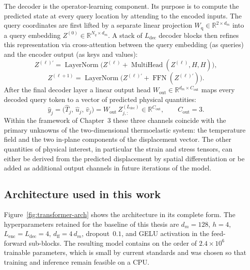 The decoder is the operator-learning component. Its purpose is to
compute the predicted state at every query location by attending to
the encoded inputs. The query coordinates are first lifted by a
separate linear projection
\(W_{\mathrm{q}}\in\mathbb{R}^{2\times d_m}\) into a query
embedding \(Z^{(0)}\in\mathbb{R}^{N_q\times d_m}\). A stack of
\(L_{\mathrm{dec}}\) decoder blocks then refines this representation
via cross-attention between the query embedding (as queries) and the
encoder output (as keys and values):
\begin{equation}
Z^{(\ell)'} =
\operatorname{LayerNorm}\!\big(
  Z^{(\ell)} +
  \operatorname{MultiHead}(Z^{(\ell)},H,H)
\big),
\end{equation}
\begin{equation}
Z^{(\ell+1)} =
\operatorname{LayerNorm}\!\big(
  Z^{(\ell)'} +
  \operatorname{FFN}(Z^{(\ell)'})
\big).
\end{equation}
After the final decoder layer a linear output head
\(W_{\mathrm{out}}\in\mathbb{R}^{d_m\times C_{\mathrm{out}}}\)
maps every decoded query token to a vector of predicted physical
quantities:
\begin{equation}
\hat{y}_j =
\big(\hat T_j,\,\hat u_j,\,\hat v_j\big) =
W_{\mathrm{out}}\,Z^{(L_{\mathrm{dec}})}_{j,:}
\in\mathbb{R}^{C_{\mathrm{out}}},
\qquad C_{\mathrm{out}} = 3.
\end{equation}
Within the framework of Chapter~3 these three channels coincide with
the primary unknowns of the two-dimensional thermoelastic system: the
temperature field and the two in-plane components of the displacement
vector. The other
quantities of physical interest, in particular the strain and stress
tensors, can either be derived from the predicted displacement by
spatial differentiation or be added as additional output channels in
future iterations of the model.

\subsection{Architecture used in this work}

Figure~\ref{fig:transformer-arch} shows the architecture in its
complete form. The hyperparameters retained for the baseline of this
thesis are \(d_m=128\), \(h=4\),
\(L_{\mathrm{enc}}=L_{\mathrm{dec}}=4\), \(d_{\mathrm{ff}}=4\,d_m\),
dropout~\(0.1\), and GELU activation in the feed-forward sub-blocks.
The resulting model contains on the order of \(2.4\times 10^6\)
trainable parameters, which is small by current standards and was
chosen so that training and inference remain feasible on a CPU.

